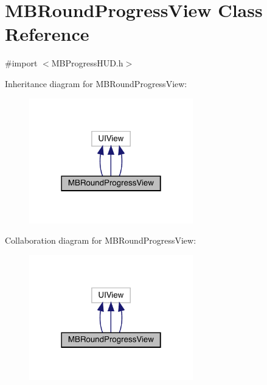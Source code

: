 \hypertarget{interface_m_b_round_progress_view}{}\section{M\+B\+Round\+Progress\+View Class Reference}
\label{interface_m_b_round_progress_view}


{\ttfamily \#import $<$M\+B\+Progress\+H\+U\+D.\+h$>$}



Inheritance diagram for M\+B\+Round\+Progress\+View\+:\nopagebreak
\begin{figure}[H]
\begin{center}
\leavevmode
\includegraphics[width=202pt]{interface_m_b_round_progress_view__inherit__graph}
\end{center}
\end{figure}


Collaboration diagram for M\+B\+Round\+Progress\+View\+:\nopagebreak
\begin{figure}[H]
\begin{center}
\leavevmode
\includegraphics[width=202pt]{interface_m_b_round_progress_view__coll__graph}
\end{center}
\end{figure}
